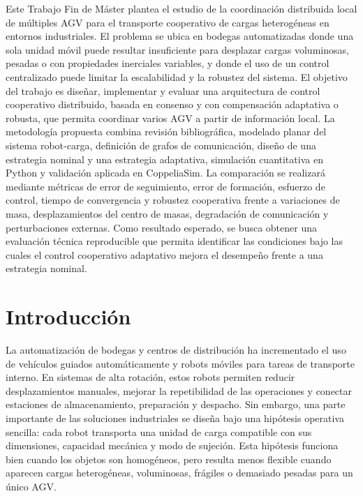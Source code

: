 \documentclass[12pt,a4paper]{article}
\begin{document}
\makeviuwordcover

\begin{viuabstract}
Este Trabajo Fin de Máster plantea el estudio de la coordinación distribuida local de múltiples AGV para el transporte cooperativo de cargas heterogéneas en entornos industriales. El problema se ubica en bodegas automatizadas donde una sola unidad móvil puede resultar insuficiente para desplazar cargas voluminosas, pesadas o con propiedades inerciales variables, y donde el uso de un control centralizado puede limitar la escalabilidad y la robustez del sistema. El objetivo del trabajo es diseñar, implementar y evaluar una arquitectura de control cooperativo distribuido, basada en consenso y con compensación adaptativa o robusta, que permita coordinar varios AGV a partir de información local. La metodología propuesta combina revisión bibliográfica, modelado planar del sistema robot-carga, definición de grafos de comunicación, diseño de una estrategia nominal y una estrategia adaptativa, simulación cuantitativa en Python y validación aplicada en CoppeliaSim. La comparación se realizará mediante métricas de error de seguimiento, error de formación, esfuerzo de control, tiempo de convergencia y robustez cooperativa frente a variaciones de masa, desplazamientos del centro de masas, degradación de comunicación y perturbaciones externas. Como resultado esperado, se busca obtener una evaluación técnica reproducible que permita identificar las condiciones bajo las cuales el control cooperativo adaptativo mejora el desempeño frente a una estrategia nominal.

\end{viuabstract}

\frontindexes
{}

\section{Introducción}

La automatización de bodegas y centros de distribución ha incrementado el uso de vehículos guiados automáticamente y robots móviles para tareas de transporte interno. En sistemas de alta rotación, estos robots permiten reducir desplazamientos manuales, mejorar la repetibilidad de las operaciones y conectar estaciones de almacenamiento, preparación y despacho. Sin embargo, una parte importante de las soluciones industriales se diseña bajo una hipótesis operativa sencilla: cada robot transporta una unidad de carga compatible con sus dimensiones, capacidad mecánica y modo de sujeción. Esta hipótesis funciona bien cuando los objetos son homogéneos, pero resulta menos flexible cuando aparecen cargas heterogéneas, voluminosas, frágiles o demasiado pesadas para un único AGV.
\end{document}
